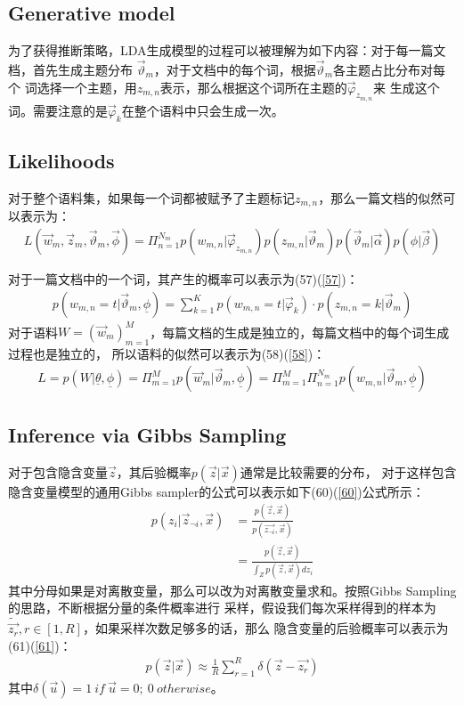\documentclass[UTF8]{ctexart}
\begin{document}
\subsection{Generative model}
为了获得推断策略，LDA生成模型的过程可以被理解为如下内容：对于每一篇文档，首先生成主题分布
$\vec{\vartheta}_m$，对于文档中的每个词，根据$\vec{\vartheta}_m$各主题占比分布对每个
词选择一个主题，用$z_{m,n}$表示，那么根据这个词所在主题的$\vec{\varphi}_{z_{m,n}}$来
生成这个词。需要注意的是$\vec{\varphi}_k$在整个语料中只会生成一次。

\subsection{Likelihoods}
对于整个语料集，如果每一个词都被赋予了主题标记$z_{m,n}$，那么一篇文档的似然可以表示为：
\begin{align}
L(\vec{w}_m, \vec{z}_m, \vec{\vartheta}_m, \vec{\phi}) = \Pi_{n=1}^{N_m}
p(w_{m,n}|\vec{\varphi}_{z_{m,n}}) p(z_{m,n}|\vec{\vartheta}_m) p(\vec{\vartheta}_m|\vec{\alpha}) p(\phi|\vec{\beta})
\end{align}
\par
对于一篇文档中的一个词，其产生的概率可以表示为(57)(\ref{57})：
\begin{align}
\label{57}
p(w_{m,n}=t|\vec{\vartheta}_m, \underline{\phi}) = \sum_{k=1}^K
p(w_{m,n}=t|\vec{\varphi}_k) \cdot p(z_{m,n}=k|\vec{\vartheta}_m)
\end{align}
对于语料$W=(\vec{w}_m)_{m=1}^M$，每篇文档的生成是独立的，每篇文档中的每个词生成过程也是独立的，
所以语料的似然可以表示为(58)(\ref{58})：
\begin{align}
\label{58}
L = p(W|\underline{\theta}, \underline{\phi}) = \Pi_{m=1}^M 
p(\vec{w}_m|\vec{\vartheta}_m, \underline{\phi}) = \Pi_{m=1}^M \Pi_{n=1}^{N_m}
p(w_{m,n}|\vec{\vartheta}_m, \underline{\phi})
\end{align}


\subsection{Inference via Gibbs Sampling}
对于包含隐含变量$\vec{z}$，其后验概率$p(\vec{z}|\vec{x})$通常是比较需要的分布，
对于这样包含隐含变量模型的通用Gibbs sampler的公式可以表示如下(60)(\ref{60})公式所示：
\begin{align}
\label{60}
p(z_i|\vec{z}_{\neg i}, \vec{x}) &= \frac{p(\vec{z}, \vec{x})}{p(\vec{z_{\neg i}}, \vec{x})}
\\
&= \frac{p(\vec{z},\vec{x})}{\int_{Z}p(\vec{z}, \vec{x})dz_i}
\end{align}
其中分母如果是对离散变量，那么可以改为对离散变量求和。按照Gibbs Sampling的思路，不断根据分量的条件概率进行
采样，假设我们每次采样得到的样本为$\tilde{\vec{z_r}}, r \in [1, R]$，如果采样次数足够多的话，那么
隐含变量的后验概率可以表示为(61)(\ref{61})：
\begin{align}
\label{61}
p(\vec{z}|\vec{x}) \approx \frac{1}{R}\sum_{r=1}^R \delta(\vec{z} - \vec{z_r})
\end{align}
其中$\delta(\vec{u}) = {1 \ if \ \vec{u}=0;\  0 \  otherwise}$。
\end{document}
